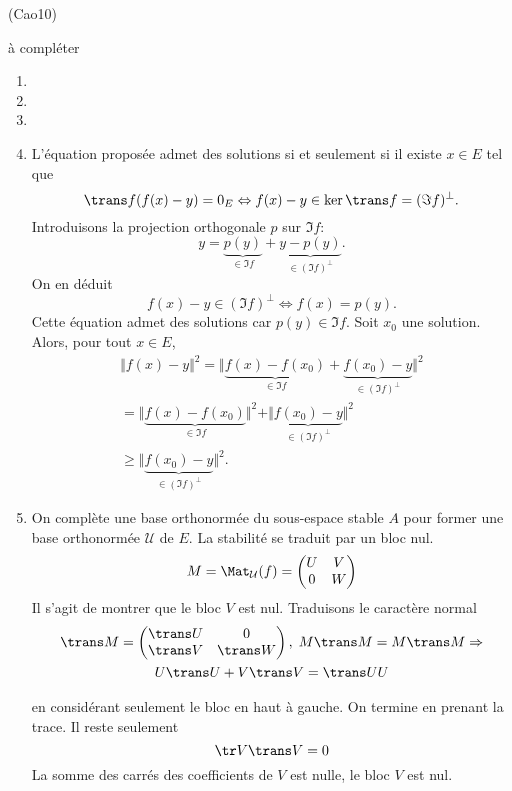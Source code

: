 \begin{tiny}(Cao10)\end{tiny} à compléter
\begin{enumerate}
  \item 
  \item
  \item 
  \item L'équation proposée admet des solutions si et seulement si il existe $x\in E$ tel que
\[
  \trans f(f(x) - y) = 0_E
  \Leftrightarrow
  f(x) - y \in \ker \trans f = (\Im f)^\bot. 
\]
Introduisons la projection orthogonale $p$ sur $\Im f$:
\[
  y = \underset{ \in \Im f}{\underbrace{p(y)}} + \underset{ \in (\Im f)^\bot}{\underbrace{y - p(y)}}.
\]
On en déduit
\[
  f(x) - y \in (\Im f)^\bot
  \Leftrightarrow
  f(x) = p(y).
\]
Cette équation admet des solutions car $p(y) \in \Im f$.\newline
Soit $x_0$ une solution. Alors, pour tout $x \in E$,
\begin{multline*}
  \Vert f(x) - y \Vert ^2
  = \Vert \underset{ \in \Im f}{\underbrace{f(x) - f(x_0)}} + \underset{ \in (\Im f)^\bot}{\underbrace{f(x_0) - y}} \Vert ^2 \\
  =  \Vert \underset{ \in \Im f}{\underbrace{f(x) - f(x_0)}}\Vert ^2 + \Vert \underset{ \in (\Im f)^\bot}{\underbrace{f(x_0) - y}} \Vert ^2\\
  \geq \Vert \underset{ \in (\Im f)^\bot}{\underbrace{f(x_0) - y}} \Vert ^2.
\end{multline*}


  \item On complète une base orthonormée du sous-espace stable $A$ pour former une base orthonormée $\mathcal{U}$ de $E$. La stabilité se traduit par un bloc nul.
\begin{displaymath}
M = \Mat_{\mathcal{U}}(f)=
\begin{pmatrix}
  U & V \\ 0 & W
\end{pmatrix}
\end{displaymath}
Il s'agit de montrer que le bloc $V$ est nul. Traduisons le caractère normal
\begin{multline*}
\trans M =
\begin{pmatrix}
  \trans U & 0 \\ \trans V & \trans W
\end{pmatrix}, \;
M \trans M = M \trans M \Rightarrow\\
  U\trans U + V\trans V =\trans U U
\end{multline*}

en considérant seulement le bloc en haut à gauche. On termine en prenant la trace. Il reste seulement
\begin{displaymath}
  \tr V\trans V = 0
\end{displaymath}
La somme des carrés des coefficients de $V$ est nulle, le bloc $V$ est nul.
\end{enumerate}
